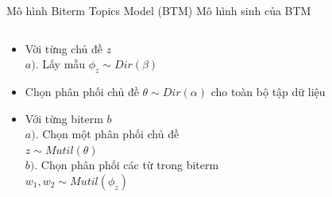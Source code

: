 \documentclass[pdf]{beamer}
\begin{document}
\begin{frame}{Mô hình Biterm Topics Model (BTM)}
	Mô hình sinh của BTM
	\begin{columns}[T] %
		\begin{column}{.55\textwidth}
			\begin{itemize}
				\item Vời từng chủ đề $z$ \\
				$a). $ Lấy mẫu $\phi_z \sim Dir(\beta)$
				\item Chọn phân phối chủ đề $\theta \sim Dir(\alpha)$ cho toàn bộ tập dữ liệu
				\item Với từng biterm $b$ \\
				$a). $ Chọn một phân phối chủ đề \\ 
					$z \sim Mutil(\theta)$ \\
				$b). $ Chọn phân phối các từ trong biterm \\
				\centering $w_1, w_2 \sim Mutil(\phi_z)$
			\end{itemize}
		\end{column} %
		\hfill%
		\begin{column}{.43\textwidth}
			\begin{figure}
			\end{figure}				
		\end{column} %
	\end{columns}

\end{frame}
\end{document}
